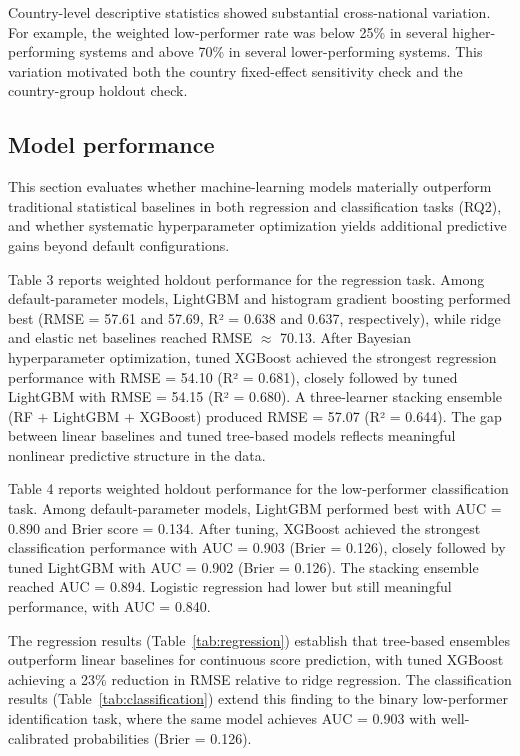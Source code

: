 \documentclass[pdflatex,sn-mathphys-ay]{sn-jnl}
\begin{document}


Country-level descriptive statistics showed substantial cross-national variation. For example, the weighted low-performer rate was below 25\% in several higher-performing systems and above 70\% in several lower-performing systems. This variation motivated both the country fixed-effect sensitivity check and the country-group holdout check.

\FloatBarrier
\subsection{Model performance}

This section evaluates whether machine-learning models materially outperform traditional statistical baselines in both regression and classification tasks (RQ2), and whether systematic hyperparameter optimization yields additional predictive gains beyond default configurations.

Table 3 reports weighted holdout performance for the regression task. Among default-parameter models, LightGBM and histogram gradient boosting performed best (RMSE = 57.61 and 57.69, R² = 0.638 and 0.637, respectively), while ridge and elastic net baselines reached RMSE $\approx$ 70.13. After Bayesian hyperparameter optimization, tuned XGBoost achieved the strongest regression performance with RMSE = 54.10 (R² = 0.681), closely followed by tuned LightGBM with RMSE = 54.15 (R² = 0.680). A three-learner stacking ensemble (RF + LightGBM + XGBoost) produced RMSE = 57.07 (R² = 0.644). The gap between linear baselines and tuned tree-based models reflects meaningful nonlinear predictive structure in the data.

Table 4 reports weighted holdout performance for the low-performer classification task. Among default-parameter models, LightGBM performed best with AUC = 0.890 and Brier score = 0.134. After tuning, XGBoost achieved the strongest classification performance with AUC = 0.903 (Brier = 0.126), closely followed by tuned LightGBM with AUC = 0.902 (Brier = 0.126). The stacking ensemble reached AUC = 0.894. Logistic regression had lower but still meaningful performance, with AUC = 0.840.



The regression results (Table~\ref{tab:regression}) establish that tree-based ensembles outperform linear baselines for continuous score prediction, with tuned XGBoost achieving a 23\% reduction in RMSE relative to ridge regression. The classification results (Table~\ref{tab:classification}) extend this finding to the binary low-performer identification task, where the same model achieves AUC = 0.903 with well-calibrated probabilities (Brier = 0.126).
\end{document}
